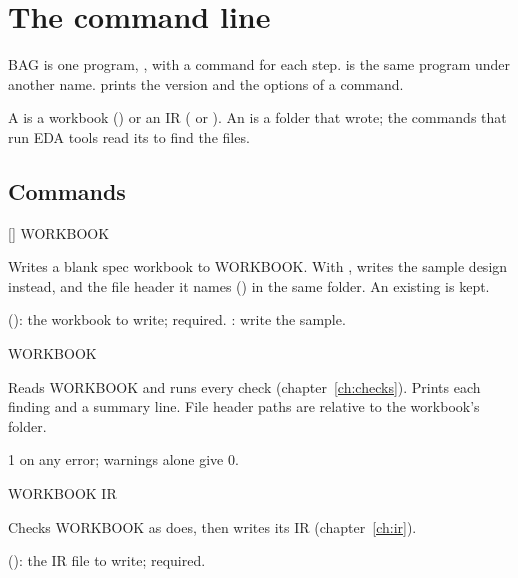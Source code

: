 \chapter{The command line}
\label{ch:cli}

BAG is one program, , with a command for each step.  is the same
program under another name.  prints the version and
 the options of a command.

A  is a workbook () or an IR ( or ).
An  is a folder that  wrote; the commands that
run EDA tools read its  to find the files.

\section{Commands}

\begin{entry}{ []  WORKBOOK}
\item[Does] Writes a blank spec workbook to WORKBOOK. With , writes the
  sample design  instead, and the file header it names
  () in the same folder. An existing  is kept.
\item[Options]  (): the workbook to write; required.
  : write the sample.
\end{entry}

\begin{entry}{ WORKBOOK}
\item[Does] Reads WORKBOOK and runs every check (chapter~\ref{ch:checks}). Prints each
  finding and a summary line. File header paths are relative to the workbook's folder.
\item[Exit status] 1 on any error; warnings alone give 0.
\end{entry}

\begin{entry}{ WORKBOOK  IR}
\item[Does] Checks WORKBOOK as  does, then writes its IR
  (chapter~\ref{ch:ir}).
\item[Options]  (): the IR file to write; required.
\end{entry}

